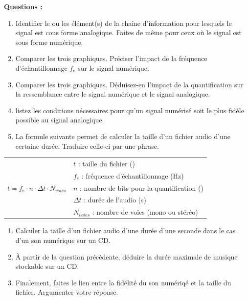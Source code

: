 \documentclass[a4paper,12pt,fleqn]{article}%
\begin{document}
\textbf{Questions :}
\begin{enumerate}
	\item Identifier le ou les élément(s) de la chaîne d'information pour lesquels le signal est cous forme analogique. Faites de même pour ceux où le signal est sous forme numérique.
	\item Comparer les trois graphiques. Préciser l'impact de la fréquence d'échantillonnage $f_e$ sur le signal numérique.
	\item Comparer les trois graphiques. Déduisez-en l'impact de la quantification sur la ressemblance entre le signal numérique et le signal analogique.
	\item listez les conditions nécessaires pour qu'un signal numérisé soit le plus fidèle possible au signal analogique.
	\item La formule suivante permet de calculer la taille d'un fichier audio d'une certaine durée. Traduire celle-ci par une phrase.
\end{enumerate}
\begin{center}
	\begin{tabular}{c|l}
		\multirow{5}{*}{$t=f_e \cdot n \cdot \Delta t \cdot N_{voies}$} & $t$ : taille du fichier (\unit{\bit})\\
		& $f_e$ : fréquence d'échantillonnage (\unit{\hertz})\\
		& $n$ : nombre de bits pour  la quantification (\unit{\bit})\\
		& $\Delta t$ : durée de l'audio (\unit{\second})\\
		& $N_{voies}$ : nombre de voies (mono ou stéréo)\\
	\end{tabular}
\end{center}
\begin{enumerate}[resume]
	\item Calculer la taille d'un fichier audio d'une durée d'une seconde dans le cas d'un son numérique sur un CD.
	\item À partir de la question précédente, déduire la durée maximale de musique stockable sur un CD.
	\item Finalement, faites le lien entre la fidélité du son numériqé et la taille du fichier. Argumenter votre réponse.
\end{enumerate}
\end{document}
